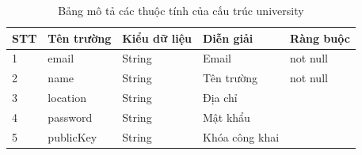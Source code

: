 \begin{table}[H]
\caption{Bảng mô tả các thuộc tính của cấu trúc university}
	\label{table:university}
	\begin{tabularx} {\textwidth} {|p{1cm}|p{3cm}|p{3cm}|X|p{2cm}|}
\hline
		STT &	Tên trường & Kiểu dữ liệu & Diễn giải & Ràng buộc \\ \hline
		1 & email	& String & Email  & not null \\ \hline
		2 & name & String  & Tên trường   & not null \\ \hline
		3 & location	&  String & Địa chỉ  & \\ \hline
		4 & password	& String & Mật khẩu  & \\ \hline
		5 & publicKey	& String & Khóa công khai   & \\ \hline
\end{tabularx}
\end{table}

